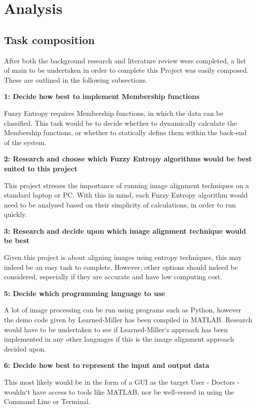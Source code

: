 \section{Analysis}

\subsection{Task composition}

After both the background research and literature review were completed, a list of main  to be undertaken in order to complete this Project was easily composed. These are outlined in the following subsections.

\noindent \textbf{1: Decide how best to implement Membership functions}

Fuzzy Entropy requires Membership functions, in which the data can be classified. This task would be to decide whether to dynamically calculate the Membership functions, or whether to statically define them within the back-end of the system.

\noindent \textbf{2: Research and choose which Fuzzy Entropy algorithms would be best suited to this project}

This project stresses the importance of running image alignment techniques on a standard laptop or PC. With this in mind, each Fuzzy Entropy algorithm would need to be analysed based on their simplicity of calculations, in order to run quickly.

\noindent \textbf{3: Research and decide upon which image alignment technique would be best}

Given this project is about aligning images using entropy techniques, this may indeed be an easy task to complete. However, other options should indeed be considered, especially if they are accurate and have low computing cost.

\noindent \textbf{5: Decide which programming language to use}

A lot of image processing can be run using programs such as Python, however the demo code given by Learned-Miller \cite{joint-alignment} has been compiled in MATLAB. Research would have to be undertaken to see if Learned-Miller`s approach has been implemented in any other languages if this is the image alignment approach decided upon.

\noindent \textbf{6: Decide how best to represent the input and output data}

This most likely would be in the form of a \acrshort{GUI} as the target User - Doctors - wouldn`t have access to tools like MATLAB, nor be well-versed in using the Command Line or Terminal.


